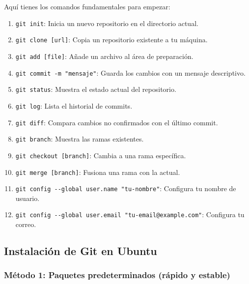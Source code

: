 \documentclass[
  doc,
  floatsintext,
  longtable,
  a4paper,
  nolmodern,
  notxfonts,
  notimes,
  colorlinks=true,linkcolor=blue,citecolor=blue,urlcolor=blue]{apa7}
\providecommand{\tightlist}{%
  \setlength{\itemsep}{0pt}\setlength{\parskip}{0pt}}
\begin{document}
Aquí tienes los comandos fundamentales para empezar:

\begin{enumerate}
\def\labelenumi{\arabic{enumi}.}
\tightlist
\item
  \texttt{git\ init}: Inicia un nuevo repositorio en el directorio
  actual.
\item
  \texttt{git\ clone\ {[}url{]}}: Copia un repositorio existente a tu
  máquina.
\item
  \texttt{git\ add\ {[}file{]}}: Añade un archivo al área de
  preparación.
\item
  \texttt{git\ commit\ -m\ "mensaje"}: Guarda los cambios con un mensaje
  descriptivo.
\item
  \texttt{git\ status}: Muestra el estado actual del repositorio.
\item
  \texttt{git\ log}: Lista el historial de commits.
\item
  \texttt{git\ diff}: Compara cambios no confirmados con el último
  commit.
\item
  \texttt{git\ branch}: Muestra las ramas existentes.
\item
  \texttt{git\ checkout\ {[}branch{]}}: Cambia a una rama específica.
\item
  \texttt{git\ merge\ {[}branch{]}}: Fusiona una rama con la actual.
\item
  \texttt{git\ config\ -\/-global\ user.name\ "tu-nombre"}: Configura tu
  nombre de usuario.
\item
  \texttt{git\ config\ -\/-global\ user.email\ "tu-email@example.com"}:
  Configura tu correo.
\end{enumerate}

\subsection{Instalación de Git en
Ubuntu}\label{instalaciuxf3n-de-git-en-ubuntu}

\subsubsection{Método 1: Paquetes predeterminados (rápido y
estable)}\label{muxe9todo-1-paquetes-predeterminados-ruxe1pido-y-estable}
\end{document}
